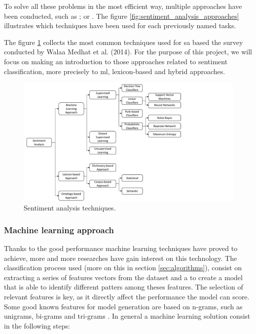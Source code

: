 To solve all these problems in the most efficient way, multiple approaches have been conducted, such as \cite{tripathy2016classification}; \cite{mullen2004sentiment} or \cite{pouransari2014deep}. The figure \ref{fig:sentiment_analysis_approaches} illustrates which techniques have been used for each previously named tasks.

\FloatBarrier

The figure \ref{fig:sentiment_analysis_techniques} collects the most common techniques used for \acrshort{sa} based the survey conducted by Walaa Medhat et al. (2014). For the purpose of this project, we will focus on making an introduction to those approaches related to sentiment classification, more precisely to \acrfull{ml}, lexicon-based and hybrid approaches.

\begin{figure}[!htp]
  \center
  \includegraphics[width=1\textwidth]{figures/sentiment_analysis_techniques}
  \caption{Sentiment analysis techniques\cite{medhat2014sentiment}.}
  \label{fig:sentiment_analysis_techniques}
\end{figure}

\FloatBarrier

\subsubsection{Machine learning approach}
\label{subsubsec:techniques_machine_learning}

Thanks to the good performance machine learning techniques have proved to achieve, more and more researches have gain interest on this technology. The classification process used (more on this in section \ref{sec:algorithms}), consist on extracting a series of features vectors from the dataset and a to create a model that is able to identify different patters among theses features. The selection of relevant features is key, as it directly affect the performance the model can score. Some good known features for model generation are based on n-grams, such as unigrams, bi-grams and tri-grams \cite{furnkranz1998study}. In general a machine learning solution consist in the following steps:

